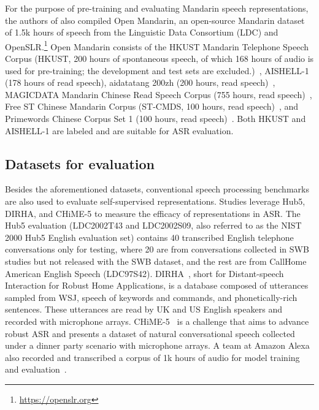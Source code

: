 For the purpose of pre-training and evaluating Mandarin speech representations,
the authors of \parencite{jiang_improving_2019, jiang_further_2021} also compiled Open Mandarin, 
an open-source Mandarin dataset of 1.5k hours of speech from
the Linguistic Data Consortium (LDC) and
OpenSLR.\footnote{\url{https://openslr.org}} Open Mandarin consists of the HKUST
Mandarin Telephone Speech Corpus (HKUST, 200 hours of spontaneous 
speech, of which
168 hours of audio is used for pre-training; the development and test sets are
excluded.)~\parencite{liu_hkust_2006}, AISHELL-1~\parencite{bu_aishell1_2017} (178 hours of
read speech),
aidatatang 200zh (200 hours, read speech)~\parencite{beijingdatatangtechnologycoltd_aidatatang_}, MAGICDATA
Mandarin Chinese Read Speech Corpus (755 hours, read speech)~\parencite{magicdatatechnologycoltd_magicdata_2019},
Free ST Chinese Mandarin Corpus (ST-CMDS, 100 hours, read speech)~\parencite{surfingtechcoltd_stcmds_},
and Primewords Chinese Corpus Set 1 (100 hours, read speech)~\parencite{primewordsinformationtechnologycoltd_primewords_2018}. 
Both HKUST and AISHELL-1 are labeled and are suitable for ASR evaluation.


\subsection{Datasets for evaluation}

Besides the aforementioned datasets, conventional speech processing benchmarks
are also used to evaluate self-supervised representations. Studies leverage Hub5,
DIRHA, and CHiME-5 to measure the efficacy of representations in ASR.
The Hub5 evaluation (LDC2002T43 and LDC2002S09, also referred to as the NIST 2000
Hub5 English evaluation set) contains 40 transcribed English telephone
conversations only for testing, where 20 are from conversations collected in
SWB studies but not released with the SWB dataset, and the rest are from CallHome
American English Speech (LDC97S42). DIRHA~\parencite{ravanelli_dirhaenglish_2015}, short for
Distant-speech Interaction for Robust Home Applications, is a database composed
of utterances sampled from WSJ, speech of keywords and commands, and
phonetically-rich sentences. These utterances are read by UK and US English
speakers and recorded with microphone arrays. CHiME-5~\parencite{barker_fifth_2018} is
a challenge that aims to advance robust ASR and presents a dataset of natural
conversational speech collected under a dinner party scenario with microphone
arrays. A team at Amazon Alexa also recorded and transcribed a corpus of 1k
hours of audio for model training and evaluation~\parencite{sadhu_wav2vecc_2021}.

